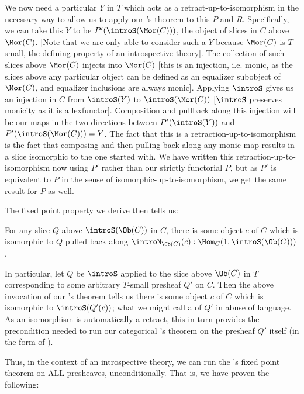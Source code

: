 We now need a particular $Y$ in $T$ which acts as a retract-up-to-isomorphism in the necessary way to allow us to apply our \Loeb's theorem to this $P$ and $R$. Specifically, we can take this $Y$ to be $P'(\introS(\Mor(C)))$, the object of slices in $C$ above $\Mor(C)$. [Note that we are only able to consider such a $Y$ because $\Mor(C)$ is $T$-small, the defining property of an introspective theory]. The collection of such slices above $\Mor(C)$ injects into $\Mor(C)$ [this is an injection, i.e. monic, as the slices above any particular object can be defined as an equalizer subobject of $\Mor(C)$, and equalizer inclusions are always monic]. Applying $\introS$ gives us an injection in $C$ from $\introS(Y)$ to $\introS(\Mor(C))$ [$\introS$ preserves monicity as it is a lexfunctor]. Composition and pullback along this injection will be our maps in the two directions between $P'(\introS(Y))$ and $P'(\introS(\Mor(C))) = Y$. The fact that this is a retraction-up-to-isomorphism is the fact that composing and then pulling back along any monic map results in a slice isomorphic to the one started with. We have written this retraction-up-to-isomorphism now using $P'$ rather than our strictly functorial $P$, but as $P'$ is equivalent to $P$ in the sense of isomorphic-up-to-isomorphism, we get the same result for $P$ as well. 

The fixed point property we derive then tells us:

\begin{theorem}\label{ObjectToSetFixedPoint}
For any slice $Q$ above $\introS(\Ob(C))$ in $C$, there is some object $c$ of $C$ which is isomorphic to $Q$ pulled back along $\introN_{\Ob(C)}(c) : \Hom_C(1, \introS(\Ob(C)))$.
\end{theorem}

In particular, let $Q$ be $\introS$ applied to the slice above $\Ob(C)$ in $T$ corresponding to some arbitrary $T$-small presheaf $Q'$ on $C$. Then the above invocation of our \Loeb's theorem tells us there is some object $c$ of $C$ which is isomorphic to $\introS(Q'(c))$; what we might call a  of $Q'$ in abuse of language. As an isomorphism is automatically a retract, this in turn provides the precondition needed to run our categorical \Loeb's theorem on the presheaf $Q'$ itself (in the form of ).

Thus, in the context of an introspective theory, we can run the \Loeb's fixed point theorem on ALL presheaves, unconditionally. That is, we have proven the following:

